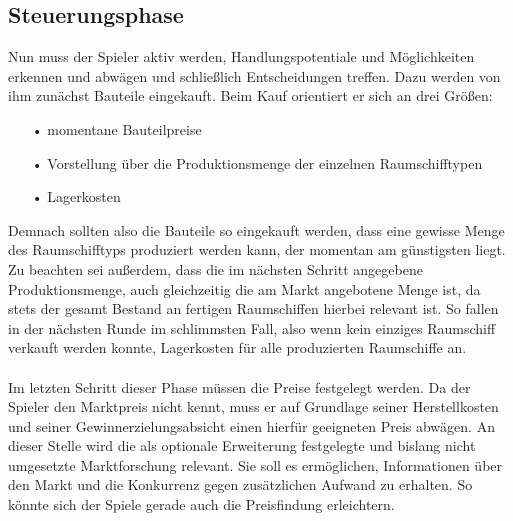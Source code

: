 \subsection{Steuerungsphase}
\label{sub:spielwelt-regeln-steuerungsphase}


Nun muss der Spieler aktiv werden, Handlungspotentiale und Möglichkeiten erkennen und abwägen und schließlich Entscheidungen treffen. Dazu werden von ihm zunächst Bauteile eingekauft. Beim Kauf orientiert er sich an drei Größen: 

\begin{itemize}
\item[•] momentane Bauteilpreise
\item[•] Vorstellung über die Produktionsmenge der einzelnen Raumschifftypen
\item[•] Lagerkosten 
\end{itemize}

Demnach sollten also die Bauteile so eingekauft werden, dass eine gewisse Menge des Raumschifftyps produziert werden kann, der momentan am günstigsten liegt. Zu beachten sei außerdem, dass die im nächsten Schritt angegebene Produktionsmenge, auch gleichzeitig die am Markt angebotene Menge ist, da stets der gesamt Bestand an fertigen Raumschiffen hierbei relevant ist. So fallen in der nächsten Runde im schlimmsten Fall, also wenn kein einziges Raumschiff verkauft werden konnte, Lagerkosten für alle produzierten Raumschiffe an.  
\\
\\
Im letzten Schritt dieser Phase müssen die Preise festgelegt werden. Da der Spieler den Marktpreis nicht kennt, muss er auf Grundlage seiner Herstellkosten und seiner Gewinnerzielungsabsicht einen hierfür geeigneten Preis abwägen. An dieser Stelle wird die als optionale Erweiterung festgelegte und bislang nicht umgesetzte Marktforschung relevant.  Sie soll es ermöglichen, Informationen über den Markt und die Konkurrenz gegen zusätzlichen Aufwand zu erhalten. So könnte sich der Spiele gerade auch die Preisfindung erleichtern. 






